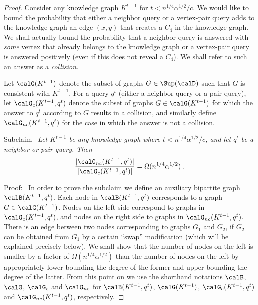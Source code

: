 \begin{proof}
Consider any knowledge graph $K^{t-1}$ for $t < n^{1/4}\alpha^{1/2}/c$.
We would like to bound the probability that either a neighbor query or a vertex-pair query adds to the knowledge graph an edge $(x,y)$ that creates a $C_4$ in the knowledge graph. We shall actually bound the probability that a neighbor query is answered with \emph{some} vertex that already belongs to the knowledge graph or a vertex-pair query is answered positively (even if this does not reveal a $C_4$).
We shall refer to such an answer as a \emph{collision}. %

Let $\calG(K^{t-1})$ denote the subset of graphs  $G\in \Sup(\calD)$ such that %
$G$ is consistent with $K^{t-1}$. For a query $q^t$ (either a neighbor query or a pair query), let $\calG_c(K^{t-1},q^t)$ denote the subset of graphs  $G\in \calG(K^{t-1})$ for which the answer to $q^t$ according to %
$G$ results in a collision, and similarly define $\calG_{nc}(K^{t-1},q^t)$ for the case in which the answer is not a collision. %

\smallskip\noindent
\textsf{Subclaim}~
\emph{
Let $K^{t-1}$ be any knowledge graph where $t < n^{1/4}\alpha^{1/2}/c$, and let $q^t$ be a neighbor or pair query.
Then
$$ \frac{|\calG_{nc}(K^{t-1},q^t)|}{|\calG_{c}(K^{t-1},q^t)|} = \Omega(n^{1/4}\alpha^{1/2}) \;.$$
}

\smallskip
\noindent
\textsf{Proof:}~
In order to prove the subclaim we define an auxiliary bipartite graph $\calB(K^{t-1},q^t)$. Each node in $\calB(K^{t-1},q^t)$ corresponds to a graph $G \in \calG(K^{t-1})$.
Nodes on the left side correspond to graphs in $\calG_{c}(K^{t-1},q^t)$, and nodes on the right side to graphs in $\calG_{nc}(K^{t-1},q^t)$.
 There is an edge between two nodes corresponding to graphs $G_1$ and $G_2$, if $G_2$ can be obtained from $G_1$ by a certain ``swap'' modification (which will be explained precisely below). We shall show that the number of nodes on the left is smaller by a factor of $\Omega(n^{1/4}\alpha^{1/2})$ than the number of nodes on the left by appropriately lower bounding the degree of the former and upper bounding the degree of the latter.
 From this point on we use the shorthand notations $\calB$, $\calG$, $\calG_c$ and $\calG_{nc}$ for $\calB(K^{t-1},q^t)$, $\calG(K^{t-1})$, $\calG_c(K^{t-1},q^t)$ and $\calG_{nc}(K^{t-1},q^t)$, respectively.


\end{proof}

